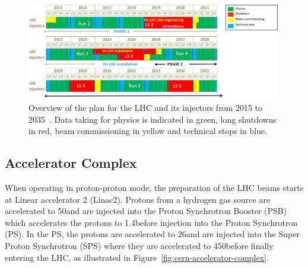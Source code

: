 \begin{figure}[htb]
\begin{center}
\includegraphics[width=0.99\textwidth]{figs/lhc/LHC-Planning.jpg}
\caption{Overview of the plan for the LHC and its injectors from 2015 to 2035~\cite{P2TrackerTDR}. Data taking for physics is indicated in green, long shutdowns in red, beam commissioning in yellow and technical stops in blue.}
\label{fig:lhc-planning}
\end{center}
\end{figure}

\subsection{Accelerator Complex}\label{subsec:acceleratorComplex}
When operating in proton-proton mode, the preparation of the LHC beams starts at Linear accelerator 2 (Linac2). 
Protons from a hydrogen gas source are accelerated to 50\MeV and are injected into the Proton Synchrotron Booster (PSB) which accelerates the protons to 1.4\GeV before injection into the Proton Synchrotron (PS). 
In the PS, the protons are accelerated to 26\GeV and are injected into the Super Proton Synchrotron (SPS) where they are accelerated to 450\GeV before finally entering the LHC, as illustrated in Figure~\ref{fig:cern-accelerator-complex}. 

